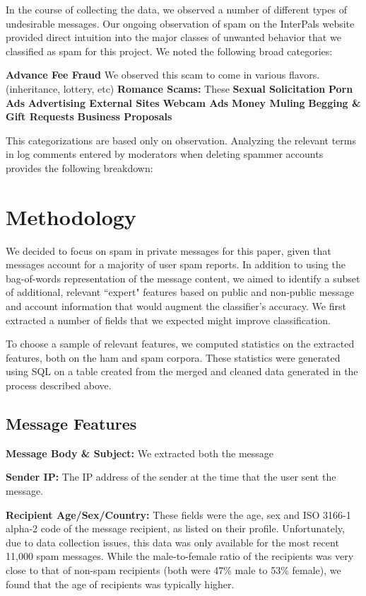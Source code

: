 \documentclass[preprint]{acm_proc_article-sp}
\begin{document}
In the course of collecting the data, we observed a number of different types of undesirable messages. Our ongoing observation of spam on the InterPals website provided direct intuition into the major classes of unwanted behavior that we classified as spam for this project. We noted the following broad categories:

\textbf{Advance Fee Fraud} We observed this scam to come in various flavors.  (inheritance, lottery,  etc)
\textbf{Romance Scams:} These 
\textbf{Sexual Solicitation}
\textbf{Porn Ads}
\textbf{Advertising External Sites}
\textbf{Webcam Ads}
\textbf{Money Muling}
\textbf{Begging \& Gift Requests}
\textbf{Business Proposals}


This categorizations are based only on observation. Analyzing the relevant terms in log comments entered by moderators when deleting spammer accounts provides the following breakdown:


\section{Methodology}

We decided to focus on spam in private messages for this paper, given that messages account for a majority of user spam reports. In addition to using the bag-of-words representation of the message content, we aimed to identify a subset of additional, relevant ``expert" features based on public and non-public message and account information that would augment the classifier's accuracy. We first extracted a number of fields that we expected might improve classification. 

To choose a sample of relevant features, we computed statistics on the extracted features, both on the ham and spam corpora. These statistics were generated using SQL on a table created from the merged and cleaned data generated in the process described above.

\subsection{Message Features}

\textbf{Message Body \& Subject:} We extracted both the message 

\textbf{Sender IP:} The IP address of the sender at the time that the user sent the message. 

\textbf{Recipient Age/Sex/Country:} These fields were the age, sex and ISO 3166-1 alpha-2 code of the message 
recipient, as listed on their profile. Unfortunately, due to data collection issues, this data was only available 
for the most recent 11,000 spam messages. While the male-to-female ratio of the recipients was very close to that 
of non-spam recipients (both were 47\% male to 53\% female), we found that the age of recipients was typically higher.
\end{document}
